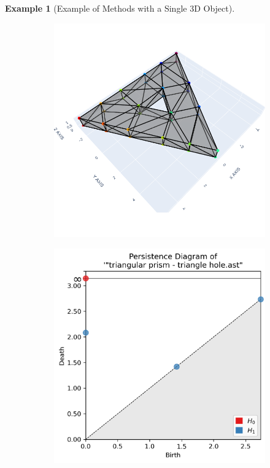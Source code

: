 \documentclass[ma]{uncgdissertationexp}
\theoremstyle{plain}
\theoremstyle{definition}
\newtheorem{example}[theorem]{Example}
\theoremstyle{remark}
\begin{document}
\begin{example}[Example of Methods with a Single 3D Object]
\begin{figure}[H]
\begin{subfigure}[b]{0.3\textwidth}
        \caption{}
        \label{fig:initial_stl}
    \end{subfigure}
    \hfill
    \begin{subfigure}[b]{0.3\textwidth}
        \centering
        \includegraphics[width=\textwidth]{Final Run, (triangular prism - triangle hole) meshpy screenshot.png}
        \caption{}
        \label{fig:meshpy_of_stl}
    \end{subfigure}
    \hfill
    \begin{subfigure}[b]{0.3\textwidth}
        \centering
        \includegraphics[width=\textwidth]{Final Run, (triangular prism - triangle hole) persdia.png}

\end{subfigure}
\end{figure}
\end{example}
\end{document}
